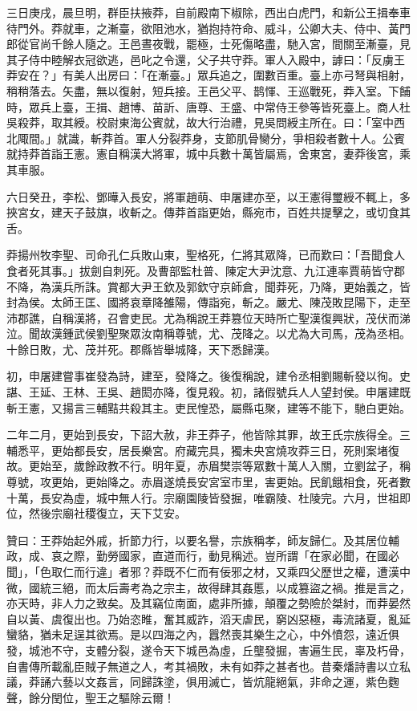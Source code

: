 \begin{pinyinscope}
三日庚戌，晨旦明，群臣扶掖莽，自前殿南下椒除，西出白虎門，和新公王揖奉車待門外。莽就車，之漸臺，欲阻池水，猶抱持符命、威斗，公卿大夫、侍中、黃門郎從官尚千餘人隨之。王邑晝夜戰，罷極，士死傷略盡，馳入宮，間關至漸臺，見其子侍中睦解衣冠欲逃，邑叱之令還，父子共守莽。軍人入殿中，謼曰：「反虜王莽安在？」有美人出房曰：「在漸臺。」眾兵追之，圍數百重。臺上亦弓弩與相射，稍稍落去。矢盡，無以復射，短兵接。王邑父平、鹊惲、王巡戰死，莽入室。下餔時，眾兵上臺，王揖、趙博、苗訢、唐尊、王盛、中常侍王參等皆死臺上。商人杜吳殺莽，取其綬。校尉東海公賓就，故大行治禮，見吳問綬主所在。曰：「室中西北陬間。」就識，斬莽首。軍人分裂莽身，支節肌骨臠分，爭相殺者數十人。公賓就持莽首詣王憲。憲自稱漢大將軍，城中兵數十萬皆屬焉，舍東宮，妻莽後宮，乘其車服。

六日癸丑，李松、鄧曄入長安，將軍趙萌、申屠建亦至，以王憲得璽綬不輒上，多挾宮女，建天子鼓旗，收斬之。傳莽首詣更始，縣宛市，百姓共提擊之，或切食其舌。

莽揚州牧李聖、司命孔仁兵敗山東，聖格死，仁將其眾降，已而歎曰：「吾聞食人食者死其事。」拔劍自刺死。及曹部監杜普、陳定大尹沈意、九江連率賈萌皆守郡不降，為漢兵所誅。賞都大尹王欽及郭欽守京師倉，聞莽死，乃降，更始義之，皆封為侯。太師王匡、國將哀章降雒陽，傳詣宛，斬之。嚴尤、陳茂敗昆陽下，走至沛郡譙，自稱漢將，召會吏民。尤為稱說王莽篡位天時所亡聖漢復興狀，茂伏而涕泣。聞故漢鍾武侯劉聖聚眾汝南稱尊號，尤、茂降之。以尤為大司馬，茂為丞相。十餘日敗，尤、茂并死。郡縣皆舉城降，天下悉歸漢。

初，申屠建嘗事崔發為詩，建至，發降之。後復稱說，建令丞相劉賜斬發以徇。史諶、王延、王林、王吳、趙閎亦降，復見殺。初，諸假號兵人人望封侯。申屠建既斬王憲，又揚言三輔黠共殺其主。吏民惶恐，屬縣屯聚，建等不能下，馳白更始。

二年二月，更始到長安，下詔大赦，非王莽子，他皆除其罪，故王氏宗族得全。三輔悉平，更始都長安，居長樂宮。府藏完具，獨未央宮燒攻莽三日，死則案堵復故。更始至，歲餘政教不行。明年夏，赤眉樊崇等眾數十萬人入關，立劉盆子，稱尊號，攻更始，更始降之。赤眉遂燒長安宮室市里，害更始。民飢餓相食，死者數十萬，長安為虛，城中無人行。宗廟園陵皆發掘，唯霸陵、杜陵完。六月，世祖即位，然後宗廟社稷復立，天下艾安。

贊曰：王莽始起外戚，折節力行，以要名譽，宗族稱孝，師友歸仁。及其居位輔政，成、哀之際，勤勞國家，直道而行，動見稱述。豈所謂「在家必聞，在國必聞」，「色取仁而行違」者邪？莽既不仁而有佞邪之材，又乘四父歷世之權，遭漢中微，國統三絕，而太后壽考為之宗主，故得肆其姦慝，以成篡盜之禍。推是言之，亦天時，非人力之致矣。及其竊位南面，處非所據，顛覆之勢險於桀紂，而莽晏然自以黃、虞復出也。乃始恣睢，奮其威詐，滔天虐民，窮凶惡極，毒流諸夏，亂延蠻貉，猶未足逞其欲焉。是以四海之內，囂然喪其樂生之心，中外憤怨，遠近俱發，城池不守，支體分裂，遂令天下城邑為虛，丘壟發掘，害遍生民，辜及朽骨，自書傳所載亂臣賊子無道之人，考其禍敗，未有如莽之甚者也。昔秦燔詩書以立私議，莽誦六藝以文姦言，同歸誅塗，俱用滅亡，皆炕龍絕氣，非命之運，紫色麴聲，餘分閏位，聖王之驅除云爾！


\end{pinyinscope}